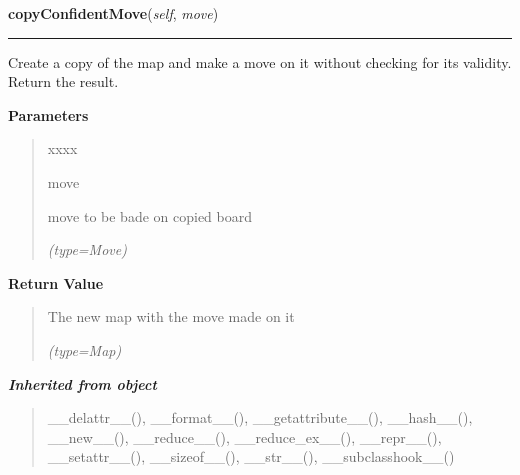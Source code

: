 \hspace{.8\funcindent}\begin{boxedminipage}{\funcwidth}

    \raggedright \textbf{copyConfidentMove}(\textit{self}, \textit{move})

    \vspace{-1.5ex}

    \rule{\textwidth}{0.5\fboxrule}
\setlength{\parskip}{2ex}
    Create a copy of the map and make a move on it without checking for its
    validity. Return the result.

\setlength{\parskip}{1ex}
      \textbf{Parameters}
      \vspace{-1ex}

      \begin{quote}
        \begin{Ventry}{xxxx}

          \item[move]

          move to be bade on copied board

            {\it (type=Move)}

        \end{Ventry}

      \end{quote}

      \textbf{Return Value}
    \vspace{-1ex}

      \begin{quote}
      The new map with the move made on it

      {\it (type=Map)}

      \end{quote}

    \end{boxedminipage}


\large{\textbf{\textit{Inherited from object}}}

\begin{quote}
\_\_delattr\_\_(), \_\_format\_\_(), \_\_getattribute\_\_(), \_\_hash\_\_(), \_\_new\_\_(), \_\_reduce\_\_(), \_\_reduce\_ex\_\_(), \_\_repr\_\_(), \_\_setattr\_\_(), \_\_sizeof\_\_(), \_\_str\_\_(), \_\_subclasshook\_\_()
\end{quote}


